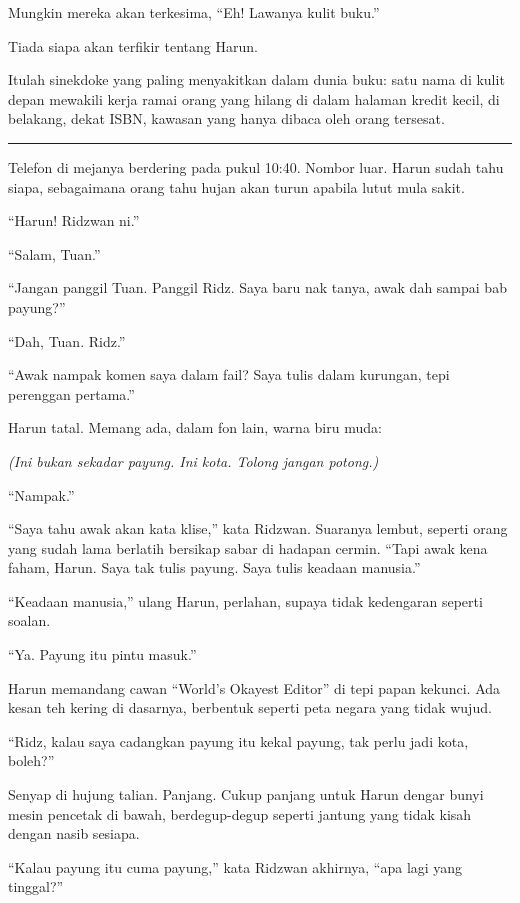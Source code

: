 \documentclass[
  11pt,
  a5paper,
  openany,
  oneside]{book}
\begin{document}
Mungkin mereka akan terkesima, ``Eh! Lawanya kulit buku.''

Tiada siapa akan terfikir tentang Harun.

Itulah sinekdoke yang paling menyakitkan dalam dunia buku: satu nama di
kulit depan mewakili kerja ramai orang yang hilang di dalam halaman
kredit kecil, di belakang, dekat ISBN, kawasan yang hanya dibaca oleh
orang tersesat.

\begin{center}\rule{0.5\linewidth}{0.5pt}\end{center}

Telefon di mejanya berdering pada pukul 10:40. Nombor luar. Harun sudah
tahu siapa, sebagaimana orang tahu hujan akan turun apabila lutut mula
sakit.

``Harun! Ridzwan ni.''

``Salam, Tuan.''

``Jangan panggil Tuan. Panggil Ridz. Saya baru nak tanya, awak dah
sampai bab payung?''

``Dah, Tuan. Ridz.''

``Awak nampak komen saya dalam fail? Saya tulis dalam kurungan, tepi
perenggan pertama.''

Harun tatal. Memang ada, dalam fon lain, warna biru muda:

\emph{(Ini bukan sekadar payung. Ini kota. Tolong jangan potong.)}

``Nampak.''

``Saya tahu awak akan kata klise,'' kata Ridzwan. Suaranya lembut,
seperti orang yang sudah lama berlatih bersikap sabar di hadapan cermin.
``Tapi awak kena faham, Harun. Saya tak tulis payung. Saya tulis keadaan
manusia.''

``Keadaan manusia,'' ulang Harun, perlahan, supaya tidak kedengaran
seperti soalan.

``Ya. Payung itu pintu masuk.''

Harun memandang cawan ``World's Okayest Editor'' di tepi papan kekunci.
Ada kesan teh kering di dasarnya, berbentuk seperti peta negara yang
tidak wujud.

``Ridz, kalau saya cadangkan payung itu kekal payung, tak perlu jadi
kota, boleh?''

Senyap di hujung talian. Panjang. Cukup panjang untuk Harun dengar bunyi
mesin pencetak di bawah, berdegup-degup seperti jantung yang tidak kisah
dengan nasib sesiapa.

``Kalau payung itu cuma payung,'' kata Ridzwan akhirnya, ``apa lagi yang
tinggal?''
\end{document}
